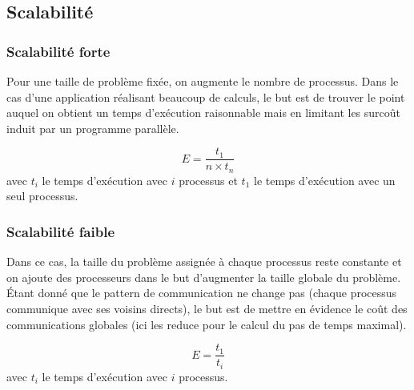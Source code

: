 





\subsection{Scalabilité}\label{sec:scal}

\subsubsection{Scalabilité forte}\label{sec:scal-strong}
Pour une taille de problème fixée, on augmente le nombre de processus. Dans le cas d'une application réalisant beaucoup de calculs, le but est de trouver le point auquel on obtient un temps d'exécution raisonnable mais en limitant les surcoût induit par un programme parallèle.

$$E=\frac{t_1}{n\times t_n}$$ avec $t_i$ le temps d'exécution avec $i$ processus et $t_1$ le temps d'exécution avec un seul processus.


\subsubsection{Scalabilité faible}\label{sec:scal-weak}
Dans ce cas, la taille du problème assignée à chaque processus reste constante et on ajoute des processeurs dans le but d'augmenter la taille globale du problème. Étant donné que le pattern de communication ne change pas (chaque processus communique avec ses voisins directs), le but est de mettre en évidence le coût des communications globales (ici les reduce pour le calcul du pas de temps maximal).


$$E=\frac{t_1}{t_i}$$ avec $t_i$ le temps d'exécution avec $i$ processus.




